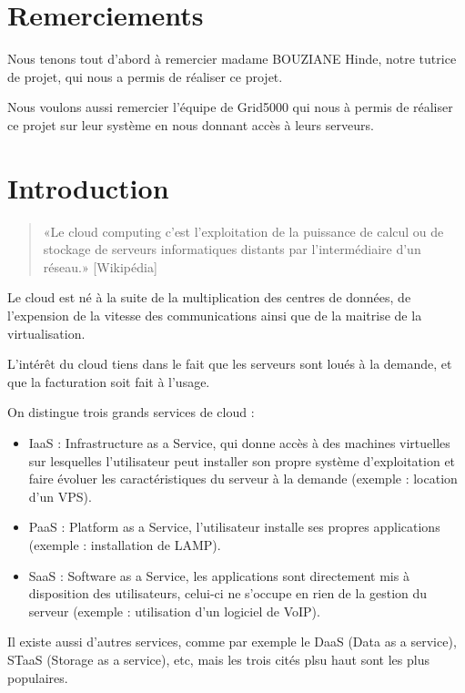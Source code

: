 \documentclass{report}
\title{%
    \begin{minipage}\linewidth
        \centering{
            RAPPORT DE PROJET \break
            "Cloud et virtualisation avec Openstack"
        }
    \end{minipage}
}
\author{%
    \begin{minipage}\linewidth
        \centering{Tutrice : BOUZIANE Hinde\break}
        \break
        \centering{
            Groupe : \break
            CULTY Alexandre,\break
            BENAIS Charles,\break
            BRESSAND Jérémy,\break
            ROGLIANO Théo
        }
        \break
    \end{minipage}
}
\date{2015 - 2016}
\begin{document}
\maketitle %

\large %

\newpage
\chapter*{Remerciements}
    Nous tenons tout d'abord à remercier madame BOUZIANE Hinde, notre tutrice de projet, qui nous a permis de réaliser ce projet.\break

    Nous voulons aussi remercier l'équipe de Grid5000 qui nous à permis de réaliser ce projet sur leur système en nous donnant accès à leurs serveurs.



\newpage
\chapter*{Introduction}
    \begin{quote}
        «Le cloud computing c'est l'exploitation de la puissance de calcul ou de stockage de serveurs informatiques distants par l'intermédiaire d'un réseau.» [Wikipédia]
    \end{quote}
    
    Le cloud est né à la suite de la multiplication des centres de données, de l'expension de la vitesse des communications ainsi que de la maitrise de la virtualisation.\break
    
    L'intérêt du cloud tiens dans le fait que les serveurs sont loués à la demande, et que la facturation soit fait à l'usage.\break
    
    On distingue trois grands services de cloud :
    \begin{itemize}
        \item IaaS : Infrastructure as a Service, qui donne accès à des machines virtuelles sur lesquelles l'utilisateur peut installer son propre système d'exploitation et faire évoluer les caractéristiques du serveur à la demande (exemple : location d'un VPS).
        \item PaaS : Platform as a Service, l'utilisateur installe ses propres applications (exemple : installation de LAMP).
        \item SaaS : Software as a Service, les applications sont directement mis à disposition des utilisateurs, celui-ci ne s'occupe en rien de la gestion du serveur (exemple : utilisation d'un logiciel de VoIP).
    \end{itemize}
    \bigbreak
    Il existe aussi d'autres services, comme par exemple le DaaS (Data as a service), STaaS (Storage as a service), etc, mais les trois cités plsu haut sont les plus populaires.
\end{document}
